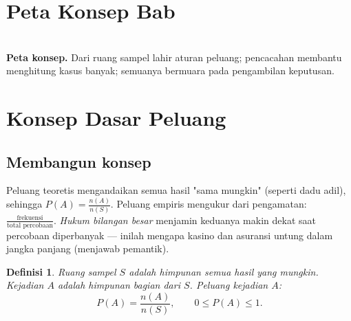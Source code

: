\documentclass[11pt,a4paper]{report}
\theoremstyle{gaya}
\newtheorem{definisi}{Definisi}[chapter]
\begin{document}
\section*{Peta Konsep Bab}
\begin{center}
\\
\small \textbf{Peta konsep.} Dari ruang sampel lahir aturan peluang; pencacahan membantu menghitung kasus banyak; semuanya bermuara pada pengambilan keputusan.
\end{center}

\section{Konsep Dasar Peluang}

\subsection*{Membangun konsep}
Peluang teoretis mengandaikan semua hasil "sama mungkin" (seperti dadu adil), sehingga $P(A)=\tfrac{n(A)}{n(S)}$. Peluang empiris mengukur dari pengamatan: $\tfrac{\text{frekuensi}}{\text{total percobaan}}$. \emph{Hukum bilangan besar} menjamin keduanya makin dekat saat percobaan diperbanyak --- inilah mengapa kasino dan asuransi untung dalam jangka panjang (menjawab pemantik).

\begin{definisi}
\emph{Ruang sampel} $S$ adalah himpunan semua hasil yang mungkin. \emph{Kejadian} $A$ adalah himpunan bagian dari $S$. Peluang kejadian $A$:
\[
P(A) = \frac{n(A)}{n(S)}, \qquad 0 \le P(A) \le 1.
\]
\end{definisi}
\end{document}
